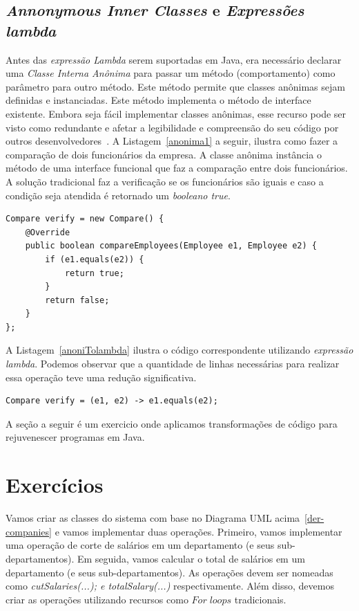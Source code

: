 \documentclass{article}
\begin{document}
\subsection{\textit{Annonymous Inner Classes} e \textit{Expressões lambda}} 

 Antes das \emph{expressão Lambda} serem suportadas em Java, era necessário declarar uma \emph{Classe Interna Anônima} para passar um método (comportamento) como parâmetro para outro método. Este método permite que classes anônimas sejam definidas e instanciadas. Este método implementa o método de interface existente. Embora seja fácil implementar classes anônimas, esse recurso  pode ser visto como redundante e afetar a legibilidade e compreensão do seu código por outros desenvolvedores~\cite{tavares2017caracterizando}. A Listagem~\ref{anonima1} a seguir, ilustra como fazer a comparação de dois funcionários da empresa. A classe anônima instância o método de uma interface funcional que faz a comparação entre dois funcionários. A solução tradicional faz a verificação se os funcionários são iguais e caso a condição seja atendida é retornado um \emph{booleano true}.

 \newpage

\begin{lstlisting}[caption={Solução tradicional utilizando classe anônima},label={anonima1},captionpos=t]
Compare verify = new Compare() {
	@Override
	public boolean compareEmployees(Employee e1, Employee e2) {
		if (e1.equals(e2)) {
			return true;
		}
		return false;
	}
};
\end{lstlisting}

A Listagem~\ref{anoniTolambda} ilustra o código correspondente utilizando \emph{expressão lambda}. Podemos observar que a quantidade de linhas necessárias para realizar essa operação teve uma redução significativa.

\begin{lstlisting}[caption={Solução utilizando expressão lambda},label={anoniTolambda},captionpos=t]
Compare verify = (e1, e2) -> e1.equals(e2);
\end{lstlisting}

A seção a seguir é um exercicio onde aplicamos transformações de código para rejuvenescer programas em Java.

\section{Exercícios}

Vamos criar as classes do sistema com base no Diagrama UML acima~\ref{der-companies} e vamos implementar duas operações. Primeiro, vamos implementar uma operação de 
corte de salários em um departamento (e seus sub-departamentos). Em seguida, vamos calcular o total de salários em um departamento (e seus sub-departamentos). As operações devem ser nomeadas como \emph{cutSalaries(...); e totalSalary(...)} respectivamente. Além disso, devemos criar as operações utilizando recursos como $For \; loops$ tradicionais.
\end{document}
